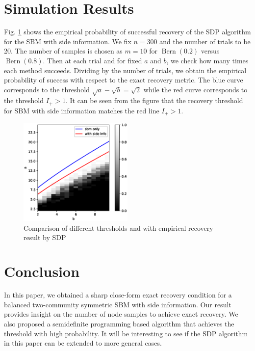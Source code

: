 \documentclass[conference]{IEEEtran}
\DeclareMathOperator{\Bern}{Bern}
\begin{document}
 	\section{Simulation Results}\label{section:experiment}
 	Fig. \ref{fig:my_label} shows the empirical probability of successful recovery of the SDP algorithm 
 	for the SBM with side information. We fix $n=300$ and the number of trials to be 20. The number of samples is chosen as $m=10$ for $\Bern(0.2)$ versus $\Bern(0.8)$. Then
 	at each trial and for fixed $a$ and $b$, we check how many times each method succeeds. Dividing
 	by the number of trials, we obtain the empirical probability of success with respect to
 	the exact recovery metric. The blue curve corresponds to the threshold $\sqrt{a}-\sqrt{b}=\sqrt{2}$ while the red curve  corresponds to the threshold $I_+ > 1$. It can be seen
 	from the figure that the recovery threshold
 	for SBM with side information matches the red line $I_+ > 1$.
 	\begin{figure}
 	    \centering
 	    \includegraphics[width=0.5\textwidth]{new_results.eps}
 	    \caption{Comparison of different thresholds and with empirical recovery result by SDP}
 	    \label{fig:my_label}
 	\end{figure}
	\section{Conclusion}\label{s:conclusion}In this paper, we obtained a sharp close-form exact recovery condition for a balanced two-community symmetric SBM with side information. %
	Our result provides insight on the number of node samples to achieve exact recovery. We also proposed a semidefinite programming based algorithm that achieves the threshold with high probability. It will be interesting to see if the SDP algorithm in this paper can be extended to more general cases.
	
	
\end{document}
